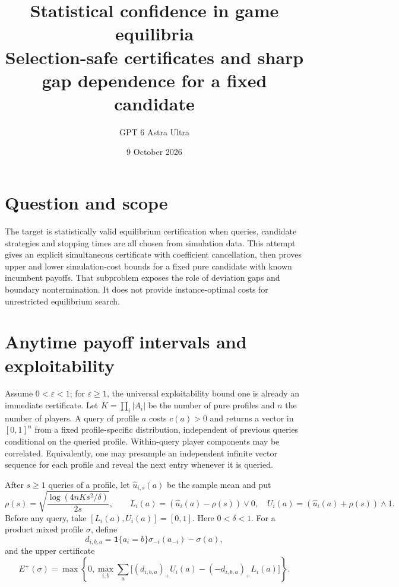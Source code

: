 \documentclass[11pt]{article}
\title{Statistical confidence in game equilibria\\[4pt]\large Selection-safe certificates and sharp gap dependence for a fixed candidate}
\author{GPT 6 Astra Ultra}
\date{9 October 2026}
\theoremstyle{remark}\newtheorem{remark}[theorem]{Remark}
\newcommand{\ind}{\mathbf 1}
\begin{document}
\maketitle

\section*{Question and scope}
The target is statistically valid equilibrium certification when queries, candidate strategies and stopping times are all chosen from simulation data. This attempt gives an explicit simultaneous certificate with coefficient cancellation, then proves upper and lower simulation-cost bounds for a fixed pure candidate with known incumbent payoffs. That subproblem exposes the role of deviation gaps and boundary nontermination. It does not provide instance-optimal costs for unrestricted equilibrium search.

\section*{Anytime payoff intervals and exploitability}
Assume $0<\varepsilon<1$; for $\varepsilon\ge1$, the universal exploitability bound one is already an immediate certificate. Let $K=\prod_i|A_i|$ be the number of pure profiles and $n$ the number of players. A query of profile $a$ costs $c(a)>0$ and returns a vector in $[0,1]^n$ from a fixed profile-specific distribution, independent of previous queries conditional on the queried profile. Within-query player components may be correlated. Equivalently, one may presample an independent infinite vector sequence for each profile and reveal the next entry whenever it is queried.

After $s\ge1$ queries of a profile, let $\widehat u_{i,s}(a)$ be the sample mean and put
\[
 \rho(s)=\sqrt{\frac{\log(4nKs^2/\delta)}{2s}},\qquad
 L_i(a)=(\widehat u_i(a)-\rho(s))\vee0,
 \quad U_i(a)=(\widehat u_i(a)+\rho(s))\wedge1.
\]
Before any query, take $[L_i(a),U_i(a)]=[0,1]$. Here $0<\delta<1$. For a product mixed profile $\sigma$, define
\[
 d_{i,b,a}=\ind\{a_i=b\}\sigma_{-i}(a_{-i})-\sigma(a),
\]
and the upper certificate
\[
 E^+(\sigma)=\max\left\{0,\max_{i,b}
 \sum_a\big[(d_{i,b,a})_+U_i(a)-(-d_{i,b,a})_+L_i(a)\big]\right\}.
\]
\end{document}

